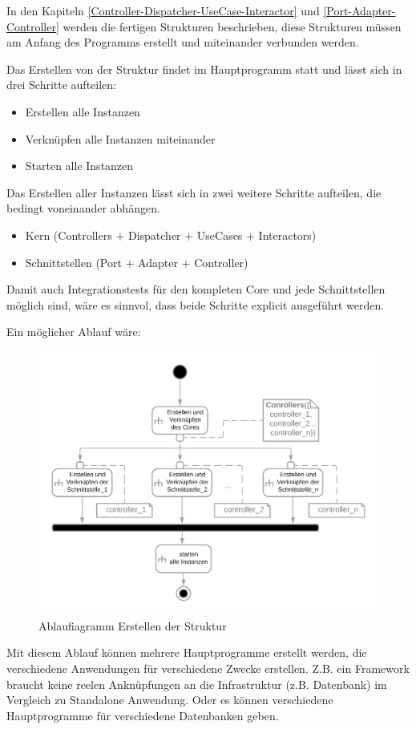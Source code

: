 In den Kapiteln \ref{Controller-Dispatcher-UseCase-Interactor} und \ref{Port-Adapter-Controller} 
werden die fertigen Strukturen beschrieben, diese Strukturen müssen am Anfang des Programms erstellt
und miteinander verbunden werden.

Das Erstellen von der Struktur findet im Hauptprogramm statt und lässt sich in drei Schritte aufteilen:
\begin{itemize}
    \item Erstellen alle Instanzen
    \item Verknüpfen alle Instanzen miteinander
    \item Starten alle Instanzen
\end{itemize}

Das Erstellen aller Instanzen lässt sich in zwei weitere Schritte aufteilen, die bedingt voneinander abhängen.
\begin{itemize}
    \item Kern (Controllers + Dispatcher + UseCases + Interactors)
    \item Schnittstellen (Port + Adapter + Controller)
\end{itemize}

Damit auch Integrationstests für den kompleten Core und jede Schnittstellen möglich sind, wäre es sinnvol, dass beide Schritte
explicit ausgeführt werden.

Ein möglicher Ablauf wäre:
\begin{figure}[H]
    \centering
    \includegraphics[width=12cm]{./images/Erstellen AD.png}
     \caption[Ablaufiagramm Erstellen der Struktur]{Ablaufiagramm Erstellen der Struktur}
     \label{fig:ADCreate}
\end{figure}

Mit diesem Ablauf können mehrere Hauptprogramme erstellt werden, die verschiedene Anwendungen für verschiedene Zwecke erstellen.
Z.B. ein Framework braucht keine reelen Anknüpfungen an die Infrastruktur (z.B. Datenbank) im Vergleich zu Standalone Anwendung.
Oder es können verschiedene Hauptprogramme für verschiedene Datenbanken geben.
